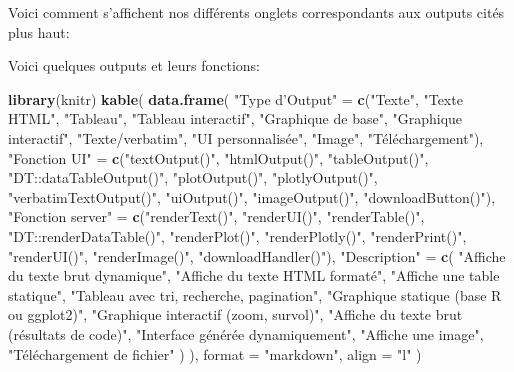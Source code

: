 \documentclass[
]{article}
\makeatletter
\newenvironment{Shaded}{\begin{snugshade}}{\end{snugshade}}
\newcommand{\AttributeTok}[1]{\textcolor[rgb]{0.13,0.29,0.53}{#1}}
\newcommand{\FunctionTok}[1]{\textcolor[rgb]{0.13,0.29,0.53}{\textbf{#1}}}
\newcommand{\NormalTok}[1]{#1}
\newcommand{\OtherTok}[1]{\textcolor[rgb]{0.56,0.35,0.01}{#1}}
\newcommand{\StringTok}[1]{\textcolor[rgb]{0.31,0.60,0.02}{#1}}
\newcommand*\pandocbounded[1]{%
  \sbox\pandoc@box{#1}%
  \Gscale@div\@tempa{\textheight}{\dimexpr\ht\pandoc@box+\dp\pandoc@box\relax}%
  \Gscale@div\@tempb{\linewidth}{\wd\pandoc@box}%
  \ifdim\@tempb\p@<\@tempa\p@\let\@tempa\@tempb\fi%
  \ifdim\@tempa\p@<\p@\scalebox{\@tempa}{\usebox\pandoc@box}%
  \else\usebox{\pandoc@box}%
  \fi%
}
\makeatother
\begin{document}
Voici comment s'affichent nos différents onglets correspondants aux
outputs cités plus haut:

\pandocbounded{\texttt{[image: ../images/output.png]}}

Voici quelques outputs et leurs fonctions:

\begin{Shaded}
\begin{Highlighting}[]
\FunctionTok{library}\NormalTok{(knitr)}
\FunctionTok{kable}\NormalTok{(}
  \FunctionTok{data.frame}\NormalTok{(}
    \StringTok{"Type d’Output"} \OtherTok{=} \FunctionTok{c}\NormalTok{(}\StringTok{"Texte"}\NormalTok{, }\StringTok{"Texte HTML"}\NormalTok{, }\StringTok{"Tableau"}\NormalTok{, }\StringTok{"Tableau interactif"}\NormalTok{, }\StringTok{"Graphique de base"}\NormalTok{, }\StringTok{"Graphique interactif"}\NormalTok{, }\StringTok{"Texte/verbatim"}\NormalTok{, }\StringTok{"UI personnalisée"}\NormalTok{, }\StringTok{"Image"}\NormalTok{, }\StringTok{"Téléchargement"}\NormalTok{),}
    \StringTok{"Fonction UI"} \OtherTok{=} \FunctionTok{c}\NormalTok{(}\StringTok{"textOutput()"}\NormalTok{, }\StringTok{"htmlOutput()"}\NormalTok{, }\StringTok{"tableOutput()"}\NormalTok{, }\StringTok{"DT::dataTableOutput()"}\NormalTok{, }\StringTok{"plotOutput()"}\NormalTok{, }\StringTok{"plotlyOutput()"}\NormalTok{, }\StringTok{"verbatimTextOutput()"}\NormalTok{, }\StringTok{"uiOutput()"}\NormalTok{, }\StringTok{"imageOutput()"}\NormalTok{, }\StringTok{"downloadButton()"}\NormalTok{),}
    \StringTok{"Fonction server"} \OtherTok{=} \FunctionTok{c}\NormalTok{(}\StringTok{"renderText()"}\NormalTok{, }\StringTok{"renderUI()"}\NormalTok{, }\StringTok{"renderTable()"}\NormalTok{, }\StringTok{"DT::renderDataTable()"}\NormalTok{, }\StringTok{"renderPlot()"}\NormalTok{, }\StringTok{"renderPlotly()"}\NormalTok{, }\StringTok{"renderPrint()"}\NormalTok{, }\StringTok{"renderUI()"}\NormalTok{, }\StringTok{"renderImage()"}\NormalTok{, }\StringTok{"downloadHandler()"}\NormalTok{),}
    \StringTok{"Description"} \OtherTok{=} \FunctionTok{c}\NormalTok{(}
      \StringTok{"Affiche du texte brut dynamique"}\NormalTok{,}
      \StringTok{"Affiche du texte HTML formaté"}\NormalTok{,}
      \StringTok{"Affiche une table statique"}\NormalTok{,}
      \StringTok{"Tableau avec tri, recherche, pagination"}\NormalTok{,}
      \StringTok{"Graphique statique (base R ou ggplot2)"}\NormalTok{,}
      \StringTok{"Graphique interactif (zoom, survol)"}\NormalTok{,}
      \StringTok{"Affiche du texte brut (résultats de code)"}\NormalTok{,}
      \StringTok{"Interface générée dynamiquement"}\NormalTok{,}
      \StringTok{"Affiche une image"}\NormalTok{,}
      \StringTok{"Téléchargement de fichier"}
\NormalTok{    )}
\NormalTok{  ),}
  \AttributeTok{format =} \StringTok{"markdown"}\NormalTok{,}
  \AttributeTok{align =} \StringTok{"l"}
\NormalTok{)}
\end{Highlighting}
\end{Shaded}
\end{document}

